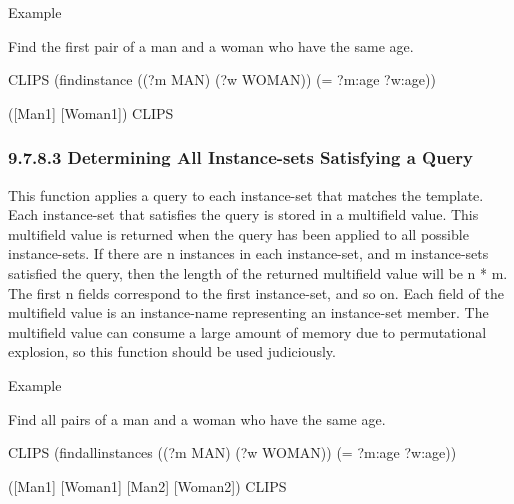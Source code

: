 \documentclass[letterpaper,10pt,english]{sphinxmanual}
\begin{document}
Example

Find the first pair of a man and a woman who have the same age.

\begin{sphinxVerbatim}[commandchars=\\\{\}]
CLIPS\PYGZgt{}
(find\PYGZhy{}instance ((?m MAN) (?w WOMAN)) (= ?m:age ?w:age))

([Man\PYGZhy{}1] [Woman\PYGZhy{}1])
CLIPS\PYGZgt{}
\end{sphinxVerbatim}


\subsubsection{9.7.8.3 Determining All Instance-sets Satisfying a Query}
\label{\detokenize{cool:determining-all-instance-sets-satisfying-a-query}}
This function applies a query to each instance-set that matches the
template. Each instance-set that satisfies the query is stored in a
multifield value. This multifield value is returned when the query has
been applied to all possible instance-sets. If there are n instances in
each instance-set, and m instance-sets satisfied the query, then the
length of the returned multifield value will be n * m. The first n
fields correspond to the first instance-set, and so on. Each field of
the multifield value is an instance-name representing an instance-set
member. The multifield value can consume a large amount of memory due to
permutational explosion, so this function should be used judiciously.


\begin{sphinxVerbatim}[commandchars=\\\{\}]
  
\end{sphinxVerbatim}

Example

Find all pairs of a man and a woman who have the same age.

\begin{sphinxVerbatim}[commandchars=\\\{\}]
CLIPS\PYGZgt{}
(find\PYGZhy{}all\PYGZhy{}instances ((?m MAN) (?w WOMAN)) (= ?m:age ?w:age))

([Man\PYGZhy{}1] [Woman\PYGZhy{}1] [Man\PYGZhy{}2] [Woman\PYGZhy{}2])
CLIPS\PYGZgt{}
\end{sphinxVerbatim}
\end{document}
